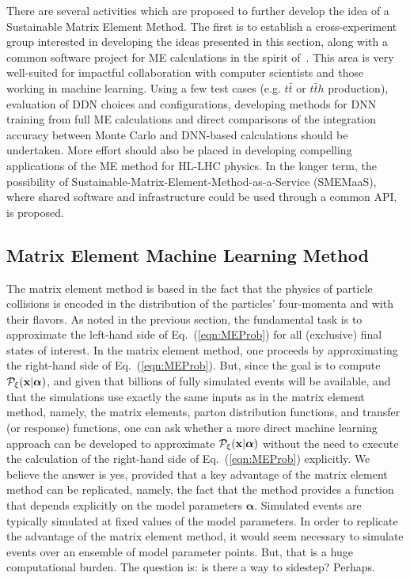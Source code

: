There are several activities which are proposed to further develop the idea of a Sustainable Matrix Element Method. The first is to establish a cross-experiment group interested in developing the ideas presented in this section, along with a common software project for ME calculations in the spirit of~\cite{MoMEMta}. This area is very well-suited for impactful collaboration with computer scientists and those working in machine learning. Using a few test cases (e.g. $t\bar{t}$ or $t\bar{t}h$ production), evaluation of DDN choices and configurations, developing methods for DNN training from full ME calculations and direct comparisons of the integration accuracy between Monte Carlo and DNN-based calculations should be undertaken. More effort should also be placed in developing compelling applications of the ME method for HL-LHC physics. In the longer term, the possibility of Sustainable-Matrix-Element-Method-as-a-Service (SMEMaaS), where shared software and infrastructure could be used through a common API, is proposed.

\subsection{Matrix Element Machine Learning Method}
The matrix element method is based in the fact that the physics of particle collisions is encoded in the distribution of the particles' four-momenta and with their flavors. As noted in the previous section, the fundamental task is to approximate the left-hand side of Eq.~(\ref{eqn:MEProb}) for all (exclusive) final states of interest. In the matrix element method, one proceeds by approximating the right-hand side of Eq.~(\ref{eqn:MEProb}). But, since the goal is to compute $\mathcal{P}_{\xi}({\bf x}|{\boldsymbol\alpha})$, and given that billions of fully simulated events will be available, and that the simulations use exactly the same inputs as in the matrix element method, namely, the matrix elements, parton distribution functions, and transfer (or response) functions, one can ask whether a more direct machine learning approach can be developed to approximate  $\mathcal{P}_{\xi}({\bf x}|{\boldsymbol\alpha})$ without the need to execute the calculation of the right-hand side of Eq.~(\ref{eqn:MEProb}) explicitly. We believe the answer is yes, provided that a key advantage of the matrix element method can be replicated, namely, the fact that the method provides a function that depends explicitly on the model parameters ${\boldsymbol\alpha}$. Simulated events are typically simulated at fixed values of the model parameters. In order to replicate the advantage of the matrix element method, it would seem necessary to simulate events over an ensemble of model parameter points. But, that is a huge computational burden. The question is: is there a way to sidestep? Perhaps.\\


